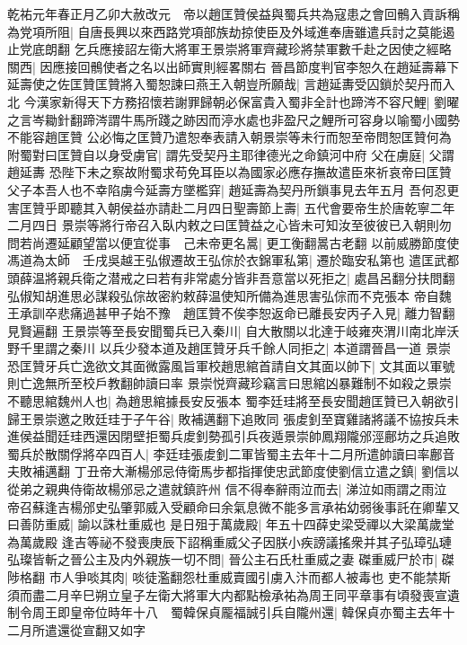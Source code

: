 乾祐元年春正月乙卯大赦改元　帝以趙匡贊侯益與蜀兵共為寇患之會回鶻入貢訴稱為党項所阻|{
	自唐長興以來西路党項部族劫掠使臣及外域進奉唐雖遣兵討之莫能遏止党底朗翻}
乞兵應接詔左衛大將軍王景崇將軍齊藏珍將禁軍數千赴之因使之經略關西|{
	因應接回鶻使者之名以出師實則經畧關右}
晉昌節度判官李恕久在趙延壽幕下延壽使之佐匡贊匡贊將入蜀恕諫曰燕王入朝豈所願哉|{
	言趙延夀受囚鎖於契丹而入北}
今漢家新得天下方務招懷若謝罪歸朝必保富貴入蜀非全計也蹄涔不容尺鯉|{
	劉曜之言岑耡針翻蹄涔謂牛馬所踐之跡因而渟水處也非盈尺之鯉所可容身以喻蜀小國勢不能容趙匡贊}
公必悔之匡贊乃遣恕奉表請入朝景崇等未行而恕至帝問恕匡贊何為附蜀對曰匡贊自以身受虜官|{
	謂先受契丹主耶律德光之命鎮河中府}
父在虜庭|{
	父謂趙延夀}
恐陛下未之察故附蜀求苟免耳臣以為國家必應存撫故遣臣來祈哀帝曰匡贊父子本吾人也不幸陷虜今延壽方墜檻穽|{
	趙延壽為契丹所鎖事見去年五月}
吾何忍更害匡贊乎即聽其入朝侯益亦請赴二月四日聖壽節上壽|{
	五代會要帝生於唐乾寧二年二月四日}
景崇等將行帝召入臥内敕之曰匡贊益之心皆未可知汝至彼彼已入朝則勿問若尚遷延顧望當以便宜從事　己未帝更名暠|{
	更工衡翻暠古老翻}
以前威勝節度使馮道為太師　壬戌吳越王弘俶遷故王弘倧於衣錦軍私第|{
	遷於臨安私第也}
遣匡武都頭薛温將親兵衛之潜戒之曰若有非常處分皆非吾意當以死拒之|{
	處昌呂翻分扶問翻弘俶知胡進思必謀殺弘倧故密約敕薛温使知所備為進思害弘倧而不克張本}
帝自魏王承訓卒悲痛過甚甲子始不豫　趙匡贊不俟李恕返命已離長安丙子入見|{
	離力智翻見賢遍翻}
王景崇等至長安聞蜀兵已入秦川|{
	自大散關以北達于岐雍夾渭川南北岸沃野千里謂之秦川}
以兵少發本道及趙匡贊牙兵千餘人同拒之|{
	本道謂晉昌一道}
景崇恐匡贊牙兵亡逸欲文其面微露風旨軍校趙思綰首請自文其面以帥下|{
	文其面以軍號則亡逸無所至校戶教翻帥讀曰率}
景崇悦齊藏珍竊言曰思綰凶暴難制不如殺之景崇不聽思綰魏州人也|{
	為趙思綰據長安反張本}
蜀李廷珪將至長安聞趙匡贊已入朝欲引歸王景崇邀之敗廷珪于子午谷|{
	敗補邁翻下追敗同}
張䖍釗至寶雞諸將議不協按兵未進侯益聞廷珪西還因閉壁拒蜀兵䖍釗勢孤引兵夜遁景崇帥鳳翔隴邠涇鄜坊之兵追敗蜀兵於散關俘將卒四百人|{
	李廷珪張䖍釗二軍皆蜀主去年十二月所遣帥讀曰率鄜音夫敗補邁翻}
丁丑帝大漸楊邠忌侍衛馬步都指揮使忠武節度使劉信立遣之鎮|{
	劉信以從弟之親典侍衛故楊邠忌之遣就鎮許州}
信不得奉辭雨泣而去|{
	涕泣如雨謂之雨泣}
帝召蘇逢吉楊邠史弘肇郭威入受顧命曰余氣息微不能多言承祐幼弱後事託在卿輩又曰善防重威|{
	諭以誅杜重威也}
是日殂于萬歲殿|{
	年五十四薛史梁受禪以大梁萬歲堂為萬歲殿}
逢吉等祕不發喪庚辰下詔稱重威父子因朕小疾謗議搖衆并其子弘璋弘璉弘璨皆斬之晉公主及内外親族一切不問|{
	晉公主石氏杜重威之妻}
磔重威尸於市|{
	磔陟格翻}
市人爭啖其肉|{
	啖徒濫翻怨杜重威賣國引虜入汴而都人被毒也}
吏不能禁斯須而盡二月辛巳朔立皇子左衛大將軍大内都點檢承祐為周王同平章事有頃發喪宣遺制令周王即皇帝位時年十八　蜀韓保貞龎福誠引兵自隴州還|{
	韓保貞亦蜀主去年十二月所遣還從宣翻又如字}

